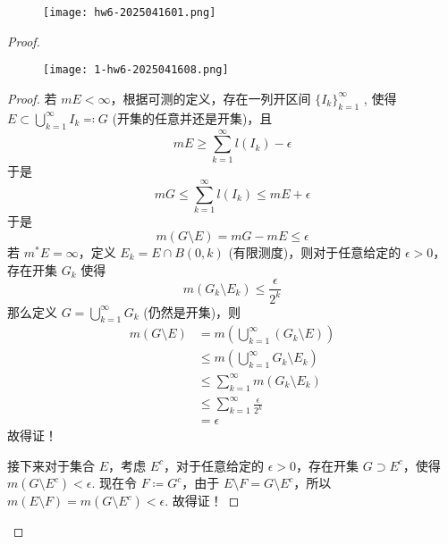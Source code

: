 \begin{exercise}
\begin{figure}[H]
\centering
\texttt{[image: hw6-2025041601.png]}
\label{}
\end{figure}
\end{exercise}
\begin{proof}

\begin{lemma}
\begin{figure}[H]
\centering
\texttt{[image: 1-hw6-2025041608.png]}
\label{}
\end{figure}\label{336926}
\end{lemma}

\begin{proof}
若 $mE<\infty$，根据可测的定义，存在一列开区间 $\{ I_k \}_{k=1}^{\infty}$ , 使得 $E\subset \bigcup_{k=1}^{\infty}I_k\eqqcolon G$ (开集的任意并还是开集)，且
\[
mE\geq \sum_{k=1}^{\infty } l(I_k)-\epsilon
\]
于是
\[
mG\leq \sum_{k=1}^{\infty} l(I_k)\leq mE+\epsilon
\]
于是
\[
m(G\setminus E)=mG-mE\leq \epsilon
\]
若 $m^{*}E=\infty$，定义 $E_k=E\cap B(0,k)$ (有限测度)，则对于任意给定的 $\epsilon>0$， 存在开集 $G_k$ 使得
\[
m(G_k\setminus E_k)\leq \frac{\epsilon}{2^{k}}
\]
那么定义 $G=\bigcup_{k=1}^{\infty }G_k$ (仍然是开集)，则
\[
\begin{aligned}
m(G\setminus E) & =m\left( \bigcup_{k=1}^{\infty} (G_k \setminus E) \right) \\
 & \leq m\left( \bigcup_{k=1}^{\infty} G_k\setminus E_k \right) \\
 & \leq \sum_{k=1}^{\infty} m(G_k\setminus E_k) \\
 & \leq \sum_{k=1}^{\infty} \frac{\epsilon}{2^{k}} \\
 & =\epsilon
\end{aligned}
\]
故得证！

接下来对于集合 $E$，考虑 $E^{c}$，对于任意给定的 $\epsilon>0$，存在开集 $G\supset E^{c}$，使得 $m(G\setminus E^{c})<\epsilon$. 现在令 $F\coloneqq G^{c}$，由于 $E\setminus F=G\setminus E^{c}$，所以 $m (E\setminus F)=m(G\setminus E^{c})<\epsilon$. 故得证！
\end{proof}


\end{proof}

